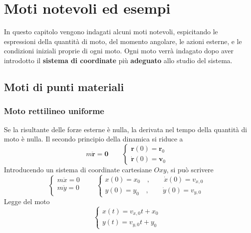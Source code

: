 \chapter{Moti notevoli ed esempi}\label{mechanics:motions}
In questo capitolo vengono indagati alcuni moti notevoli, espicitando le espressioni della quantità di moto, del momento angolare, le azioni esterne, e le condizioni iniziali proprie di ogni moto.
Ogni moto verrà indagato dopo aver introdotto il \textbf{sistema di coordinate} più \textbf{adeguato} allo studio del sistema.
\section{Moti di punti materiali}
\subsection{Moto rettilineo uniforme}
Se la risultante delle forze esterne è nulla, la derivata nel tempo della quantità di moto è nulla. Il secondo principio della dinamica si riduce a
\begin{equation}
m \ddot{\mathbf{r}} = \mathbf{0} \qquad
\begin{cases}
    \mathbf{r}(0) = \mathbf{r}_0 \\
    \dot{\mathbf{r}}(0) = \mathbf{v}_0 
\end{cases}
\end{equation}
Introducendo un sistema di coordinate cartesiane $Oxy$, si può scrivere
\begin{equation}
    \begin{cases}
        m \ddot{x} = 0 \\
        m \ddot{y} = 0 \\
    \end{cases} \qquad
    \begin{cases}
        x(0) = x_0 \quad , \qquad  \dot{x}(0) = v_{x,0} \\
        y(0) = y_0 \quad , \qquad  \dot{y}(0) = v_{y,0}
    \end{cases}
\end{equation}
Legge del moto
\begin{equation}
    \begin{cases}
        x(t) = v_{x,0} t + x_0 \\
        y(t) = v_{y,0} t + y_0
    \end{cases}
\end{equation}

